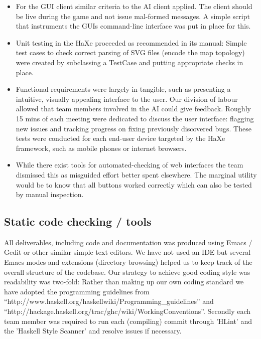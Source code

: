 \documentclass[11pt]{article}
\begin{document}
\begin{itemize}

\item For the GUI client similar criteria to the AI client applied. The
      client should be live during the game and not issue mal-formed
      messages. A simple script that instruments the GUIs command-line
      interface was put in place for this.

\item Unit testing in the HaXe proceeded as recommended in its manual:
      Simple test cases to check correct parsing of SVG files (encode
      the map topology) were created by subclassing a TestCase and
      putting appropriate checks in place.  

\item Functional requirements were largely in-tangible, such as presenting a
      intuitive, visually appealing interface to the user. Our division of
      labour allowed that team members involved in the AI could give feedback.
      Roughly 15 mins of each meeting were dedicated to discuss the user
      interface: flagging new issues and tracking progress on fixing 
      previously discovered bugs. These tests were conducted for each
      end-user device targeted by the HaXe framework, such as mobile 
      phones or internet browsers.

\item While there exist tools for automated-checking of web interfaces 
      the team dismissed this as misguided effort better spent elsewhere.
      The marginal utility would be to know that all buttons worked correctly
      which can also be tested by manual inspection. 

\end{itemize}

\subsection{Static code checking / tools}
All deliverables, including code and documentation was produced using Emacs /
Gedit or other similar simple text editors. We have not used an IDE but several
Emacs modes and extensions (directory browsing) helped us to keep track of the
overall structure of the codebase. Our strategy to achieve good coding style
was readability was two-fold: Rather than making up our own coding standard
we have adopted the programming guidelines from ``http://www.haskell.org/haskellwiki/Programming_guidelines''
and ``http://hackage.haskell.org/trac/ghc/wiki/WorkingConventions''. Secondly
each team member was required to run each (compiling) commit through 'HLint'
and the 'Haskell Style Scanner' and resolve issues if necessary. 
\end{document}
